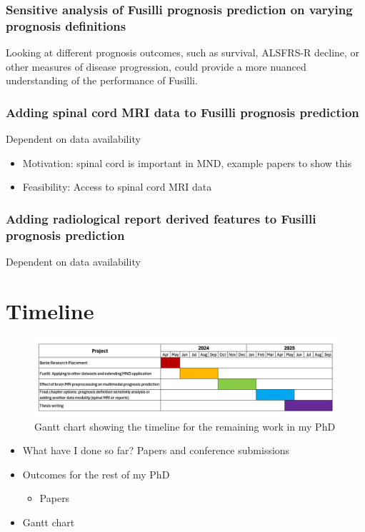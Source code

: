 \subsubsection*{Sensitive analysis of Fusilli prognosis prediction on varying prognosis definitions}

Looking at different prognosis outcomes, such as survival, ALSFRS-R decline, or other measures of disease progression, could provide a more nuanced understanding of the performance of Fusilli.

\subsubsection*{Adding spinal cord MRI data to Fusilli prognosis prediction}
Dependent on data availability
\begin{itemize}
    \item Motivation: spinal cord is important in MND, example papers to show this
    \item Feasibility: Access to spinal cord MRI data
\end{itemize}

\subsubsection{Adding radiological report derived features to Fusilli prognosis prediction}
Dependent on data availability
\section{Timeline}

\begin{figure}
    \centering
    \hspace*{-0.1\textwidth}
    \includegraphics[width=1.2\textwidth]{figures/gantt_chart}
    \caption{Gantt chart showing the timeline for the remaining work in my PhD}
    \label{fig:gantt_chart}
\end{figure}

\begin{itemize}
    \item What have I done so far? Papers and conference submissions
    \item Outcomes for the rest of my PhD
    \begin{itemize}
        \item Papers
    \end{itemize}
    \item Gantt chart
\end{itemize}
